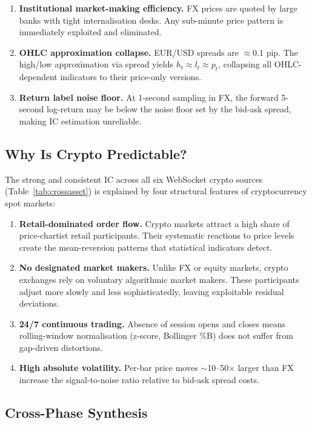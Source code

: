\documentclass[12pt,a4paper]{article}
\theoremstyle{definition}
\theoremstyle{remark}
\begin{document}
\begin{enumerate}
  \item \textbf{Institutional market-making efficiency.} FX prices are
    quoted by large banks with tight internalisation desks. Any
    sub-minute price pattern is immediately exploited and eliminated.
  \item \textbf{OHLC approximation collapse.} EUR/USD spreads are
    $\approx$0.1 pip. The high/low approximation via spread yields
    $h_t \approx l_t \approx p_t$, collapsing all OHLC-dependent
    indicators to their price-only versions.
  \item \textbf{Return label noise floor.} At 1-second sampling in
    FX, the forward 5-second log-return may be below the noise floor
    set by the bid-ask spread, making IC estimation unreliable.
\end{enumerate}

\subsection{Why Is Crypto Predictable?}
\label{sec:disc_crypto}

The strong and consistent IC across all six WebSocket crypto sources
(Table~\ref{tab:crossasset}) is explained by four structural features
of cryptocurrency spot markets:

\begin{enumerate}
  \item \textbf{Retail-dominated order flow.} Crypto markets attract
    a high share of price-chartist retail participants. Their systematic
    reactions to price levels create the mean-reversion patterns that
    statistical indicators detect.
  \item \textbf{No designated market makers.} Unlike FX or equity
    markets, crypto exchanges rely on voluntary algorithmic market
    makers. These participants adjust more slowly and less
    sophisticatedly, leaving exploitable residual deviations.
  \item \textbf{24/7 continuous trading.} Absence of session opens and
    closes means rolling-window normalisation (z-score, Bollinger \%B)
    does not suffer from gap-driven distortions.
  \item \textbf{High absolute volatility.} Per-bar price moves
    $\sim$10--50$\times$ larger than FX increase the signal-to-noise
    ratio relative to bid-ask spread costs.
\end{enumerate}

\subsection{Cross-Phase Synthesis}
\label{sec:synthesis}
\end{document}
